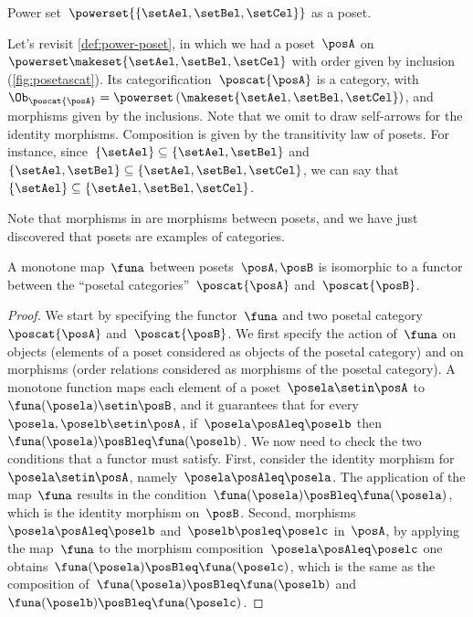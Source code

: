 \begin{marginfigure}
    \centering
    \caption{Power set~$\powerset{\{\setAel,\setBel,\setCel\}}$ as a poset. \label{fig:posetascat}}
\end{marginfigure}

\begin{example}
    Let's revisit \cref{def:power-poset}, in which we had a poset~$\posA$ on $\powerset \makeset{\setAel,\setBel,\setCel}$ with order given by inclusion (\cref{fig:posetascat}).
    Its categorification~$\poscat{\posA}$ is a category, with $\Ob_{\poscat{\posA}}=\powerset\left(\makeset{\setAel,\setBel,\setCel}\right)$, and morphisms given by the inclusions.
    Note that we omit to draw self-arrows for the identity morphisms.
    Composition is given by the transitivity law of posets.
    For instance, since~$\{\setAel\}\subseteq \{\setAel,\setBel\}$ and~$\{\setAel,\setBel\} \subseteq \{\setAel,\setBel,\setCel\}$, we can say that~$\{\setAel\}\subseteq \{\setAel,\setBel,\setCel\}$.
\end{example}



Note that morphisms in \Pos are morphisms between posets, and we have just discovered that posets are examples of categories.
\begin{lemma}
    \label{lem:posetfunctor}
    A monotone map~$\funa$ between posets~$\posA,\posB$ is isomorphic to a functor between the ``posetal categories''~$\poscat{\posA}$ and~$\poscat{\posB}$.
\end{lemma}
\begin{proof}
    We start by specifying the functor~$\funa$ and two posetal category~$\poscat{\posA}$ and~$\poscat{\posB}$.
    We first specify the action of~$\funa$ on objects (elements of a poset considered as objects of the posetal category) and on morphisms (order relations considered as morphisms of the posetal category).
    A monotone function maps each element of a poset~$\posela\setin \posA$ to~$\funa(\posela) \setin \posB$, and it guarantees that for every~$\posela,\poselb\setin \posA$, if~$\posela\posAleq \poselb$ then~$\funa(\posela)\posBleq \funa(\poselb)$.
    We now need to check the two conditions that a functor must satisfy.
    First, consider the identity morphism for~$\posela\setin \posA$, namely~$\posela \posAleq \posela$.
    The application of the map~$\funa$ results in the condition~$\funa(\posela)\posBleq \funa(\posela)$, which is the identity morphism on~$\posB$.
    Second, morphisms~$\posela\posAleq \poselb$ and~$\poselb\posleq \poselc$ in~$\posA$, by applying the map~$\funa$ to the morphism composition~$\posela\posAleq \poselc$ one obtains~$\funa(\posela)\posBleq \funa(\poselc)$, which is the same as the composition of~$\funa(\posela)\posBleq \funa(\poselb)$ and~$\funa(\poselb)\posBleq \funa(\poselc)$.
\end{proof}

